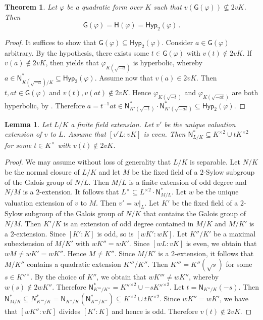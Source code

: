 \documentclass[twoside,11pt]{amsart}
\numberwithin{equation}{section}
\newtheorem{thm}[equation]{Theorem}
\newtheorem{lem}[equation]{Lemma}
\theoremstyle{definition}
\newcommand\N{\operatorname{N}}
\newcommand{\mg}[1]{{#1}^{\times}}
\newcommand{\sq}[1]{{#1}^{\times 2}}
\renewcommand{\N}{\mathsf{N}}
\newcommand{\G}{\mathsf{G}}
\renewcommand{\H}{\mathsf{H}}
\newcommand{\Hyp}{\mathsf{Hyp}}
\begin{document}
\begin{thm}\label{T:2henselian-odd-simfactor}
    Let $\varphi$ be a quadratic form over $K$ such that $v(\G(\varphi))\not\subseteq 2vK$.
    Then
    $$\G(\varphi)=\H(\varphi)=\Hyp_2(\varphi)\,.$$
\end{thm}
\begin{proof}
It suffices to show that $\G(\varphi)\subseteq\Hyp_2(\varphi)$.
Consider $a\in \G(\varphi)$ arbitrary.
By the hypothesis, there exists some $t\in\G(\varphi)$ with $v(t)\notin 2vK$.
If $v(a)\notin 2vK$, then  yields that $\varphi_{K(\sqrt{-a})}$ is hyperbolic, whereby $a\in\N_{K(\sqrt{-a})/K}^\ast\subseteq \Hyp_2(\varphi)$.
Assume now that $v(a)\in 2vK$.
Then $t,at\in\G(\varphi)$ and $v(t),v(at)\notin 2vK$. Hence $\varphi_{K(\sqrt{-t})}$ and $\varphi_{K(\sqrt{-at})}$  are both hyperbolic, by .
Therefore $a=t^{-1}at\in\N_{K'(\sqrt{-t})}^\ast\cdot \N_{K'(\sqrt{-at})}^\ast\subseteq \Hyp_2(\varphi)$.
\end{proof}


\begin{lem}\label{L:even-ramified-norms}
    Let $L/K$ a finite field extension.
    Let $v'$ be the unique valuation extension of $v$ to $L$.
    Assume that $[v'L:vK]$ is even. 
    Then 
    $\N_{L/K}^\ast\subseteq\sq{K}\cup t\sq{K}$ for some  $t\in \mg{K}$ with $v(t)\notin 2vK$.
\end{lem}
\begin{proof}
We may assume without loss of generality that $L/K$ is separable.
Let $N/K$ be the normal closure of $L/K$ and let $M$ be the fixed field of a $2$-Sylow subgroup of the Galois group of $N/L$. 
Then $M/L$ is a finite extension of odd degree and $N/M$ is a $2$-extension. 
It follows that $\mg{L}\subseteq \sq{L}\cdot \N_{M/L}^\ast$.
Let $w$ be the unique valuation extension of $v$ to $M$.
Then $v'=w|_L$.
Let $K'$ be the fixed field of a $2$-Sylow subgroup of the Galois group of $N/K$ that contains the Galois group of $N/M$.
Then $K'/K$ is an extension of odd degree contained in $M/K$ and $M/K'$ is a $2$-extension.
Since $[K':K]$ is odd, so is $[wK':wK]$.
Let $K''/K'$ be a maximal subextension of $M/K'$ with $wK''=wK'$.
    Since $[wL:vK]$ is even, we obtain that $wM\neq wK'=wK''$.
    Hence $M\neq K''$. Since $M/K'$ is a $2$-extension, it follows that $M/K''$ contains a quadratic extension $K'''/K''$.
    Then $K'''=K''(\sqrt{s})$ for some $s\in \mg{K''}$.
    By the choice of $K''$, we obtain that $wK'''\neq wK''$,
    whereby $w(s)\notin 2wK''$.
    Therefore $\N_{K'''/K''}^\ast= \sq{K''}\cup -s\sq{K''}$.
    Let $t=\N_{K''/K}(-s)$.
    Then $\N_{M/K}^\ast\subseteq 
    N_{K'''/K}^\ast=\N_{K''/K}(\N_{K'''/K''}^\ast)\subseteq\sq{K}\cup t\sq{K}$.
    Since $wK''=wK'$, we have that $[wK'':vK]$ divides $[K':K]$ and hence is odd.
    Therefore $v(t)\notin 2vK$.
\end{proof}
\end{document}
